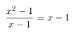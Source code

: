 \documentclass[preview]{standalone}
\begin{document}
\begin{align*}
\special{dvisvgm:raw <g id='unique000'>}\frac{x^2-1}{x-1}=x-1\special{dvisvgm:raw </g>}
\end{align*}
\end{document}
